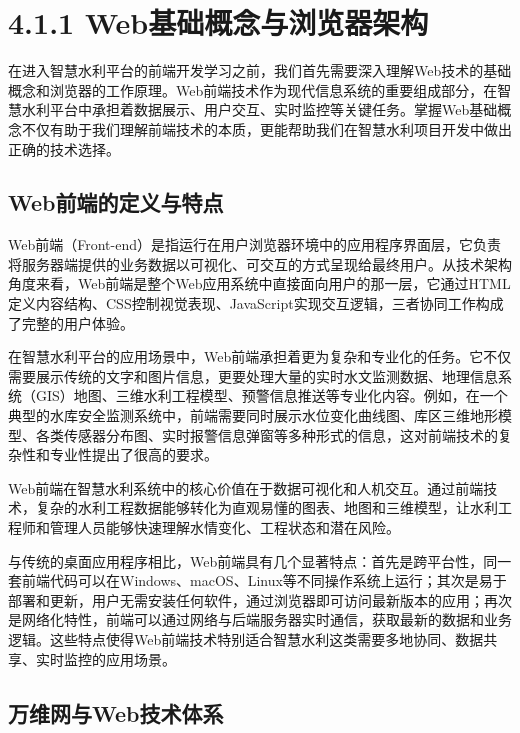 \hypertarget{webux57faux7840ux6982ux5ff5ux4e0eux6d4fux89c8ux5668ux67b6ux6784}{%
\section{4.1.1 Web基础概念与浏览器架构}\label{webux57faux7840ux6982ux5ff5ux4e0eux6d4fux89c8ux5668ux67b6ux6784}}

在进入智慧水利平台的前端开发学习之前，我们首先需要深入理解Web技术的基础概念和浏览器的工作原理。Web前端技术作为现代信息系统的重要组成部分，在智慧水利平台中承担着数据展示、用户交互、实时监控等关键任务。掌握Web基础概念不仅有助于我们理解前端技术的本质，更能帮助我们在智慧水利项目开发中做出正确的技术选择。

\hypertarget{webux524dux7aefux7684ux5b9aux4e49ux4e0eux7279ux70b9}{%
\subsection{Web前端的定义与特点}\label{webux524dux7aefux7684ux5b9aux4e49ux4e0eux7279ux70b9}}

Web前端（Front-end）是指运行在用户浏览器环境中的应用程序界面层，它负责将服务器端提供的业务数据以可视化、可交互的方式呈现给最终用户。从技术架构角度来看，Web前端是整个Web应用系统中直接面向用户的那一层，它通过HTML定义内容结构、CSS控制视觉表现、JavaScript实现交互逻辑，三者协同工作构成了完整的用户体验。

在智慧水利平台的应用场景中，Web前端承担着更为复杂和专业化的任务。它不仅需要展示传统的文字和图片信息，更要处理大量的实时水文监测数据、地理信息系统（GIS）地图、三维水利工程模型、预警信息推送等专业化内容。例如，在一个典型的水库安全监测系统中，前端需要同时展示水位变化曲线图、库区三维地形模型、各类传感器分布图、实时报警信息弹窗等多种形式的信息，这对前端技术的复杂性和专业性提出了很高的要求。

 Web前端在智慧水利系统中的核心价值在于数据可视化和人机交互。通过前端技术，复杂的水利工程数据能够转化为直观易懂的图表、地图和三维模型，让水利工程师和管理人员能够快速理解水情变化、工程状态和潜在风险。

与传统的桌面应用程序相比，Web前端具有几个显著特点：首先是跨平台性，同一套前端代码可以在Windows、macOS、Linux等不同操作系统上运行；其次是易于部署和更新，用户无需安装任何软件，通过浏览器即可访问最新版本的应用；再次是网络化特性，前端可以通过网络与后端服务器实时通信，获取最新的数据和业务逻辑。这些特点使得Web前端技术特别适合智慧水利这类需要多地协同、数据共享、实时监控的应用场景。

\hypertarget{ux4e07ux7ef4ux7f51ux4e0ewebux6280ux672fux4f53ux7cfb}{%
\subsection{万维网与Web技术体系}\label{ux4e07ux7ef4ux7f51ux4e0ewebux6280ux672fux4f53ux7cfb}}

